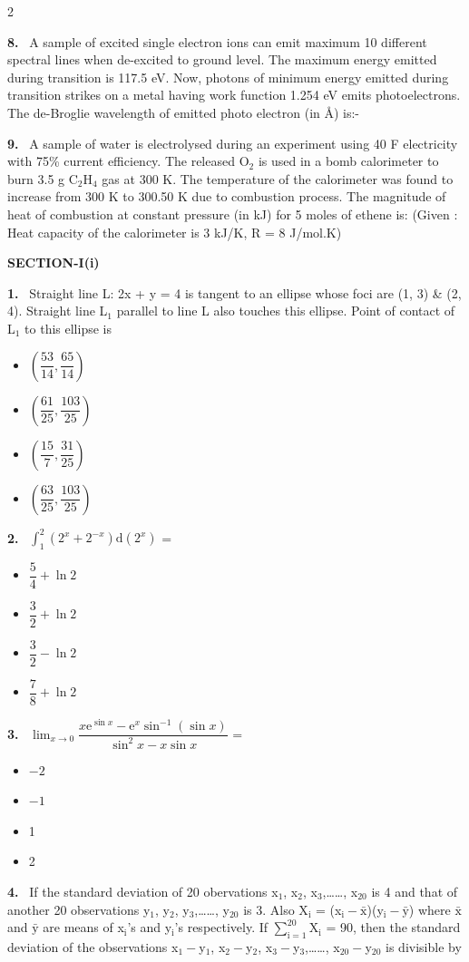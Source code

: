 \documentclass[10pt]{extarticle}
\newcommand{\papersec}[1]{\par\bigskip{\centering\Large\bfseries PAPER-#1\par}\medskip}
\newcommand{\partsec}[2]{\par\medskip\noindent{\large\bfseries PART-#1: #2}\par\smallskip}
\newcommand{\sect}[1]{\par\smallskip\noindent\textbf{#1}\par}
\newcommand{\qn}[1]{\par\smallskip\noindent\textbf{#1.}~}
\newenvironment{qoptions}{\begin{itemize}[leftmargin=1.8em,itemsep=1pt,topsep=2pt,label={}]}{\end{itemize}}
\newcommand{\opt}[2]{\item[(#1)] #2}
\begin{document}
\begin{multicols}{2}
\qn{8} A sample of excited single electron ions can emit maximum 10 different spectral lines when de-excited to ground level. The maximum energy emitted during transition is 117.5 eV. Now, photons of minimum energy emitted during transition strikes on a metal having work function 1.254 eV emits photoelectrons. The de-Broglie wavelength of emitted photo electron (in \AA) is:-
\qn{9} A sample of water is electrolysed during an experiment using 40 F electricity with 75\% current efficiency. The released O$_2$ is used in a bomb calorimeter to burn 3.5 g C$_2$H$_4$ gas at 300 K. The temperature of the calorimeter was found to increase from 300 K to 300.50 K due to combustion process. The magnitude of heat of combustion at constant pressure (in kJ) for 5 moles of ethene is: (Given : Heat capacity of the calorimeter is 3 kJ/K, R = 8 J/mol.K)
\raggedcolumns
\papersec{1}
\partsec{3}{MATHEMATICS}
\sect{SECTION-I(i)}
\qn{1} Straight line L: 2x + y = 4 is tangent to an ellipse whose foci are (1, 3) \& (2, 4). Straight line L$_1$ parallel to line L also touches this ellipse. Point of contact of L$_1$ to this ellipse is
\begin{qoptions}
\opt{A}{$\left(\dfrac{53}{14},\dfrac{65}{14}\right)$}
\opt{B}{$\left(\dfrac{61}{25},\dfrac{103}{25}\right)$}
\opt{C}{$\left(\dfrac{15}7,\dfrac{31}{25}\right)$}
\opt{D}{$\left(\dfrac{63}{25},\dfrac{103}{25}\right)$}
\end{qoptions}
\qn{2} $\displaystyle\int_1^2(2^x+2^{-x})\mathrm d(2^x)$ =
\begin{qoptions}
\opt{A}{$\dfrac54+\ln2$}
\opt{B}{$\dfrac32+\ln2$}
\opt{C}{$\dfrac32-\ln2$}
\opt{D}{$\dfrac78+\ln2$}
\end{qoptions}
\qn{3} $\displaystyle\lim_{x\to0}\dfrac{x\mathrm e^{\sin x}-\mathrm e^x\sin^{-1}(\sin x)}{\sin^2x-x\sin x}$ =
\begin{qoptions}
\opt{A}{$-2$}
\opt{B}{$-1$}
\opt{C}{1}
\opt{D}{2}
\end{qoptions}
\qn{4} If the standard deviation of 20 obervations x$_1$, x$_2$, x$_3$,\ldots\ldots, x$_{20}$ is 4 and that of another 20 observations y$_1$, y$_2$, y$_3$,\ldots\ldots, y$_{20}$ is 3. Also X$_\mathrm i$ = (x$_\mathrm i-\bar{\mathrm x}$)(y$_\mathrm i-\bar{\mathrm y}$) where $\bar{\mathrm x}$ and $\bar{\mathrm y}$ are means of x$_\mathrm i$'s and y$_\mathrm i$'s respectively. If $\displaystyle\sum_{\mathrm i=1}^{20}$X$_\mathrm i$ = 90, then the standard deviation of the observations x$_1-$y$_1$, x$_2-$y$_2$, x$_3-$y$_3$,\ldots\ldots, x$_{20}-$y$_{20}$ is divisible by
\begin{qoptions}

\end{qoptions}
\end{multicols}
\end{document}

